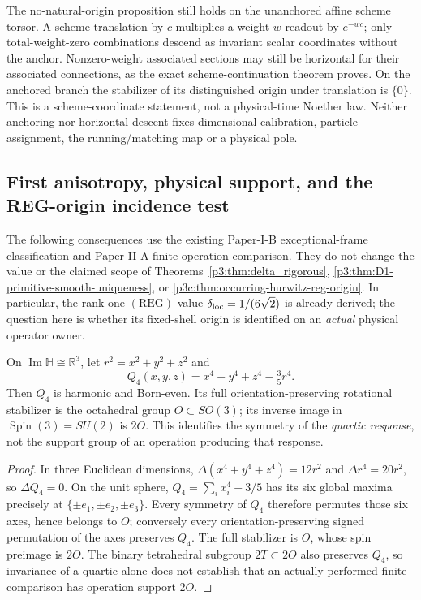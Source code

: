 \documentclass[12pt,a4paper]{article}
\begin{document}
The no-natural-origin proposition still holds on the unanchored
affine scheme torsor.  A scheme translation by \(c\) multiplies a
weight-\(w\) readout by \(e^{-wc}\); only total-weight-zero
combinations descend as invariant scalar coordinates without the anchor.
Nonzero-weight associated sections may still be horizontal for their
associated connections, as the exact scheme-continuation theorem proves.  On the
anchored branch the stabilizer of its distinguished origin under
translation is \(\{0\}\).  This is a scheme-coordinate statement,
not a physical-time Noether law.  Neither anchoring nor horizontal
descent fixes dimensional calibration, particle assignment, the
running/matching map or a physical pole.

\subsection{First anisotropy, physical support, and the REG-origin incidence test}
\label{p3c:sec:v1188-reg-incidence}

The following consequences use the existing Paper-I-B exceptional-frame
classification and Paper-II-A finite-operation comparison.  They do not
change the value or the claimed scope of
Theorems~\ref{p3:thm:delta_rigorous},
\ref{p3:thm:D1-primitive-smooth-uniqueness}, or
\ref{p3c:thm:occurring-hurwitz-reg-origin}.
In particular, the rank-one $(\mathrm{REG})$ value
$\delta_{\rm loc}=1/(6\sqrt2)$ is already derived; the question here is
whether its fixed-shell origin is identified on an \emph{actual} physical
operator owner.

\begin{proposition}
\label{p3c:prop:v1188-quartic-octahedral-stabilizer}
On $\operatorname{Im}\mathbb H\cong\mathbb R^3$, let
$r^2=x^2+y^2+z^2$ and
\[
  Q_4(x,y,z)=x^4+y^4+z^4-\tfrac35 r^4.
\]
Then $Q_4$ is harmonic and Born-even. Its full
orientation-preserving rotational stabilizer is the octahedral group
$O\subset SO(3)$; its inverse image in $\operatorname{Spin}(3)=SU(2)$
is $2O$.  This identifies the symmetry of the \emph{quartic response},
not the support group of an operation producing that response.
\end{proposition}
\begin{proof}
In three Euclidean dimensions,
$\Delta(x^4+y^4+z^4)=12r^2$ and
$\Delta r^4=20r^2$, so $\Delta Q_4=0$.
On the unit sphere,
$Q_4=\sum_i x_i^4-3/5$ has its six global maxima precisely at
$\{\pm e_1,\pm e_2,\pm e_3\}$.  Every symmetry of $Q_4$ therefore
permutes those six axes, hence belongs to $O$; conversely every
orientation-preserving signed permutation of the axes preserves $Q_4$.
The full stabilizer is $O$, whose spin preimage is $2O$.
The binary tetrahedral subgroup $2T\subset2O$ also preserves $Q_4$,
so invariance of a quartic alone does not establish that an actually
performed finite comparison has operation support $2O$.
\end{proof}
\end{document}
